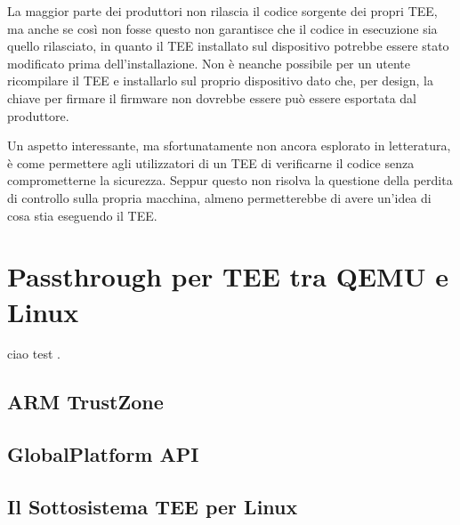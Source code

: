 \documentclass[12pt,italian]{report}
\begin{document}
La maggior parte dei produttori non rilascia il codice sorgente dei propri TEE,
ma anche se così non fosse questo non garantisce che il codice in esecuzione
sia quello rilasciato, in quanto il TEE installato sul dispositivo potrebbe
essere stato modificato prima dell'installazione.
Non è neanche possibile per un utente ricompilare il TEE e installarlo
sul proprio dispositivo dato che, per design, la chiave per firmare il firmware
non dovrebbe essere può essere esportata dal produttore.

Un aspetto interessante, ma sfortunatamente non ancora esplorato in letteratura,
è come permettere agli utilizzatori di un TEE di verificarne il codice senza
comprometterne la sicurezza.
Seppur questo non risolva la questione della perdita di controllo sulla
propria macchina, almeno permetterebbe di avere un'idea di cosa stia eseguendo
il TEE.

\chapter{Passthrough per TEE tra QEMU e Linux}
\label{chap:passthrough-tee-qemu-linux}
ciao test \cite{lim2019web}.

\section{ARM TrustZone}
\label{sec:arm-trustzone}

\section{GlobalPlatform API}
\label{sec:global-platform-api}

\section{Il Sottosistema TEE per Linux}
\label{sec:sottosistema-tee-per-linux}
\end{document}

